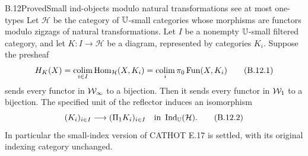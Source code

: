 \begin{claim}{B.12}{Proved}{Small ind-objects modulo natural transformations see at most one-types}
Let $\mathcal H$ be the category of $\mathbb U$-small categories
whose morphisms are functors modulo zigzags of natural
transformations. Let $I$ be a nonempty $\mathbb U$-small filtered
category, and let $K:I\to\mathcal H$ be a diagram, represented
by categories $K_i$. Suppose the presheaf
\[
 H_K(X)=\operatorname*{colim}_{i\in I}\operatorname{Hom}_{\mathcal H}(X,K_i)
       =\operatorname*{colim}_i\pi_0\operatorname{Fun}(X,K_i)
 \tag{B.12.1}
\]
sends every functor in $\mathcal W_{\infty}$ to a bijection. Then it
sends every functor in $\mathcal W_1$ to a bijection. The specified
unit of the reflector induces an isomorphism
\[
 (K_i)_{i\in I}\longrightarrow(\Pi_1K_i)_{i\in I}
 \quad\hbox{in }\operatorname{Ind}_{\mathbb U}(\mathcal H).
 \tag{B.12.2}
\]
In particular the small-index version of CATHOT E.17 is
settled, with its original indexing category unchanged.
\end{claim}
